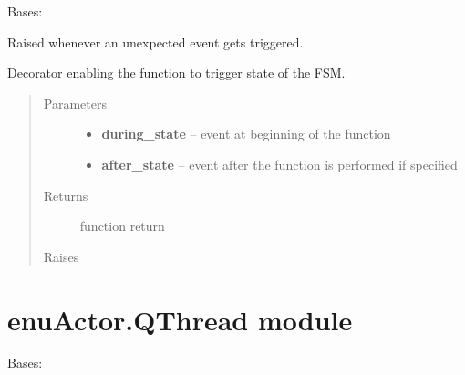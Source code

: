 \documentclass[letterpaper,10pt,english]{sphinxmanual}
\begin{document}

\begin{fulllineitems}
\label{enuActor:enuActor.MyFSM.FysomError}
Bases: 

Raised whenever an unexpected event gets triggered.

\end{fulllineitems}


\begin{fulllineitems}
\label{enuActor:enuActor.MyFSM.transition}
Decorator enabling the function to trigger state of the FSM.
\begin{quote}\begin{description}
\item[{Parameters}] \leavevmode\begin{itemize}
\item {} 
\textbf{during\_state} -- event at beginning of the function

\item {} 
\textbf{after\_state} -- event after the function is performed if specified

\end{itemize}

\item[{Returns}] \leavevmode
function return

\item[{Raises}] \leavevmode
{\hyperref[enuActor.Devices:enuActor.Devices.Error.DeviceErr]{}}

\end{description}\end{quote}

\end{fulllineitems}



\section{enuActor.QThread module}
\label{enuActor:module-enuActor.QThread}\label{enuActor:enuactor-qthread-module}

\begin{fulllineitems}
\label{enuActor:enuActor.QThread.QMsg}
Bases: 

\begin{fulllineitems}
\label{enuActor:enuActor.QThread.QMsg.DEFAULT_PRIORITY}
\end{fulllineitems}


\end{fulllineitems}
\end{document}
